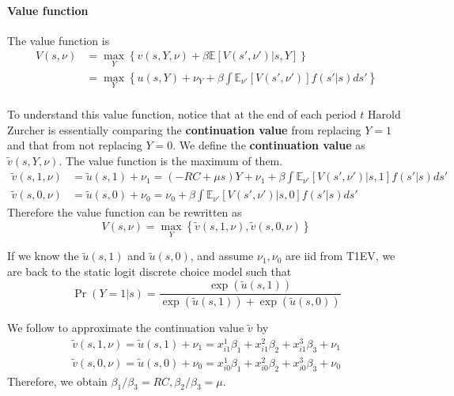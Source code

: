 \documentclass[12pt]{article}[margin=1in]
\begin{document}
\paragraph{Value function} The value function is
\begin{equation*}
    \begin{split}
        V(s, \nu) & = \max_{Y} \left\{ v(s,Y,\nu) + \beta \mathbb{E}[V(s', \nu')|s,Y] \right\}\\
        & = \max_{Y} \left\{ u(s,Y)+\nu_Y + \beta \int \mathbb{E}_{\nu'}[V(s', \nu')] f(s'|s) ds' \right\}\\
    \end{split}
\end{equation*}

To understand this value function, notice that at the end of each period $t$
Harold Zurcher is essentially comparing the \textbf{continuation value} from
replacing $Y=1$ and that from not replacing $Y=0$. We define the
\textbf{continuation value} as $\tilde{v}(s,Y,\nu)$. The value function is the
maximum of them.
\begin{align*}
    \tilde{v}(s,1,\nu) & = \tilde{u}(s,1) + \nu_1=  (-RC + \mu s)Y +\nu_1 + \beta \int \mathbb{E}_{\nu'}[V(s', \nu')|s,1] f(s'|s) ds' \\
    \tilde{v}(s,0,\nu) & = \tilde{u}(s,0) + \nu_0= \nu_0 + \beta \int \mathbb{E}_{\nu'}[V(s', \nu')|s,0] f(s'|s) ds'
\end{align*}
Therefore the value function can be rewritten as
\begin{equation*}
    V(s, \nu) = \max_Y\left\{ \tilde{v}(s,1,\nu), \tilde{v}(s,0,\nu) \right\}
\end{equation*}

If we know the $\tilde{u}(s,1)$ and $\tilde{u}(s,0)$, and assume $\nu_1,\nu_0$
are iid from T1EV, we are back to the static logit discrete choice model such
that
\begin{equation*}
    \Pr(Y=1|s) = \frac{\exp(\tilde{u}(s,1))}{\exp(\tilde{u}(s,1)) + \exp(\tilde{u}(s,0))}
\end{equation*}

We follow \citet{bajari2007estimating} to approximate the continuation value
$\tilde{v}$ by
\begin{align*}
    \tilde{v}(s,1,\nu) = \tilde{u}(s,1) + \nu_1 = x_{i1}^1\beta_1 + x_{i1}^2\beta_2 + x_{i1}^3\beta_3+ \nu_1 \\
    \tilde{v}(s,0,\nu) = \tilde{u}(s,0) + \nu_0 = x_{i0}^1\beta_1 + x_{i0}^2\beta_2 + x_{i0}^3\beta_3+ \nu_0
\end{align*}
Therefore, we obtain $\beta_1/\beta_3=RC, \beta_2/\beta_3=\mu$.
\end{document}
